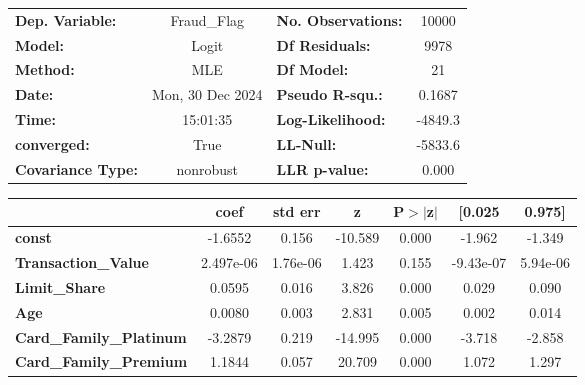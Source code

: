 \documentclass[
  letterpaper,
  DIV=11,
  numbers=noendperiod]{scrartcl}
\begin{document}
\begin{center}
\begin{tabular}{lclc}
\toprule
\textbf{Dep. Variable:}              &   Fraud\_Flag    & \textbf{  No. Observations:  } &    10000    \\
\textbf{Model:}                      &      Logit       & \textbf{  Df Residuals:      } &     9978    \\
\textbf{Method:}                     &       MLE        & \textbf{  Df Model:          } &       21    \\
\textbf{Date:}                       & Mon, 30 Dec 2024 & \textbf{  Pseudo R-squ.:     } &   0.1687    \\
\textbf{Time:}                       &     15:01:35     & \textbf{  Log-Likelihood:    } &   -4849.3   \\
\textbf{converged:}                  &       True       & \textbf{  LL-Null:           } &   -5833.6   \\
\textbf{Covariance Type:}            &    nonrobust     & \textbf{  LLR p-value:       } &    0.000    \\
\bottomrule
\end{tabular}
\begin{tabular}{lcccccc}
                                     & \textbf{coef} & \textbf{std err} & \textbf{z} & \textbf{P$> |$z$|$} & \textbf{[0.025} & \textbf{0.975]}  \\
\midrule
\textbf{const}                       &      -1.6552  &        0.156     &   -10.589  &         0.000        &       -1.962    &       -1.349     \\
\textbf{Transaction\_Value}          &    2.497e-06  &     1.76e-06     &     1.423  &         0.155        &    -9.43e-07    &     5.94e-06     \\
\textbf{Limit\_Share}                &       0.0595  &        0.016     &     3.826  &         0.000        &        0.029    &        0.090     \\
\textbf{Age}                         &       0.0080  &        0.003     &     2.831  &         0.005        &        0.002    &        0.014     \\
\textbf{Card\_Family\_Platinum}      &      -3.2879  &        0.219     &   -14.995  &         0.000        &       -3.718    &       -2.858     \\
\textbf{Card\_Family\_Premium}       &       1.1844  &        0.057     &    20.709  &         0.000        &        1.072    &        1.297     \\

\end{tabular}
\end{center}
\end{document}
